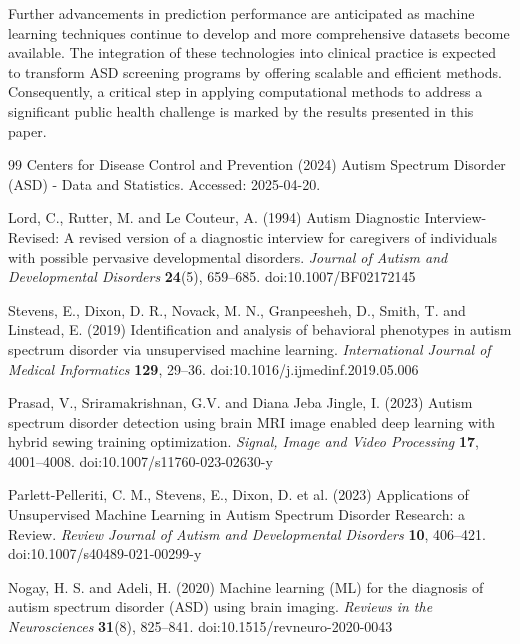 \documentclass[pdflatex,sn-nature]{sn-jnl}
\theoremstyle{thmstyleone}%
\theoremstyle{thmstyletwo}%
\theoremstyle{thmstylethree}%
\begin{document}
Further advancements in prediction performance are anticipated as machine learning techniques continue to develop and more comprehensive datasets become available. The integration of these technologies into clinical practice is expected to transform ASD screening programs by offering scalable and efficient methods. Consequently, a critical step in applying computational methods to address a significant public health challenge is marked by the results presented in this paper.

\begin{thebibliography}{99}
Centers for Disease Control and Prevention (2024) Autism Spectrum Disorder (ASD) - Data and Statistics. Accessed: 2025-04-20.

Lord, C., Rutter, M. and Le Couteur, A. (1994) Autism Diagnostic Interview-Revised: A revised version of a diagnostic interview for caregivers of individuals with possible pervasive developmental disorders. \emph{Journal of Autism and Developmental Disorders} \textbf{24}(5), 659--685. doi:10.1007/BF02172145

Stevens, E., Dixon, D. R., Novack, M. N., Granpeesheh, D., Smith, T. and Linstead, E. (2019) Identification and analysis of behavioral phenotypes in autism spectrum disorder via unsupervised machine learning. \emph{International Journal of Medical Informatics} \textbf{129}, 29--36. doi:10.1016/j.ijmedinf.2019.05.006

Prasad, V., Sriramakrishnan, G.V. and Diana Jeba Jingle, I. (2023) Autism spectrum disorder detection using brain MRI image enabled deep learning with hybrid sewing training optimization. \emph{Signal, Image and Video Processing} \textbf{17}, 4001--4008. doi:10.1007/s11760-023-02630-y

Parlett-Pelleriti, C. M., Stevens, E., Dixon, D. et al. (2023) Applications of Unsupervised Machine Learning in Autism Spectrum Disorder Research: a Review. \emph{Review Journal of Autism and Developmental Disorders} \textbf{10}, 406--421. doi:10.1007/s40489-021-00299-y

Nogay, H. S. and Adeli, H. (2020) Machine learning (ML) for the diagnosis of autism spectrum disorder (ASD) using brain imaging. \emph{Reviews in the Neurosciences} \textbf{31}(8), 825--841. doi:10.1515/revneuro-2020-0043



\end{thebibliography}
\end{document}
